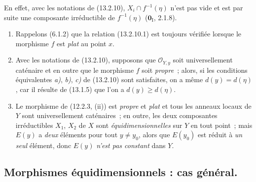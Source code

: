 En effet, avec les notations de (13.2.10), $X_i\cap f^{-1}(\eta)$ n'est pas
vide et est par suite une composante irréductible de $f^{-1}(\eta)$
($\mathbf 0_{\mathrm I}$, 2.1.8).

\begin{remarks}[13.2.12]
\label{IV.13.2.12-fr}
\begin{enumerate}[label=(\roman*)]
  \item Rappelons (6.1.2) que la relation (13.2.10.1) est toujours vérifiée
  lorsque le morphisme $f$ est \emph{plat} au point $x$.
  \item Avec les notations de (13.2.10), supposons que $\mathcal O_{Y,y}$ soit
  universellement caténaire et en outre que le morphisme $f$ soit \emph{propre}~;
  alors, si les conditions équivalentes \emph{a)}, \emph{b)}, \emph{c)} de (13.2.10) sont
  satisfaites, on a même $d(y)=d(\eta)$, car il résulte de (13.1.5) que l'on a
  $d(y)\geq d(\eta)$.
  \item Le morphisme de (12.2.3, (ii)) est \emph{propre} et \emph{plat} et tous
  les anneaux locaux de $Y$ sont universellement caténaires~; en outre, les deux
  composantes irréductibles $X_1$, $X_2$ de $X$ sont \emph{équidimensionnelles}
  sur $Y$ en tout point~; mais $E(y)$ a \emph{deux} éléments pour tout
  $y\neq y_0$, alors que $E(y_0)$ est réduit à \emph{un seul} élément, donc
  $E(y)$ \emph{n'est pas constant} dans $Y$.
\end{enumerate}
\end{remarks}

\subsection{Morphismes équidimensionnels : cas général.}
\label{subsection:IV.13.3-fr}

